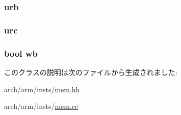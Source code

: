 \label{classArmISA_1_1RfeOp_a605d05e28dce4515bfd33f74e709f29d}
\hypertarget{classArmISA_1_1RfeOp_aa5ea75563934f5379a9abef2877e781c}{
\subsubsection[{urb}]{ {\bf urb}}}
\label{classArmISA_1_1RfeOp_aa5ea75563934f5379a9abef2877e781c}
\hypertarget{classArmISA_1_1RfeOp_a86973ec62735a43f3925953a6b8afc99}{
\subsubsection[{urc}]{ {\bf urc}}}
\label{classArmISA_1_1RfeOp_a86973ec62735a43f3925953a6b8afc99}
\hypertarget{classArmISA_1_1RfeOp_a93541ed16711b2c9c53cf093b675d90b}{
\subsubsection[{wb}]{\setlength{\rightskip}{0pt plus 5cm}bool {\bf wb}}}
\label{classArmISA_1_1RfeOp_a93541ed16711b2c9c53cf093b675d90b}


このクラスの説明は次のファイルから生成されました:\begin{DoxyCompactItemize}
\item 
arch/arm/insts/\hyperlink{arm_2insts_2mem_8hh}{mem.hh}\item 
arch/arm/insts/\hyperlink{arm_2insts_2mem_8cc}{mem.cc}\end{DoxyCompactItemize}
